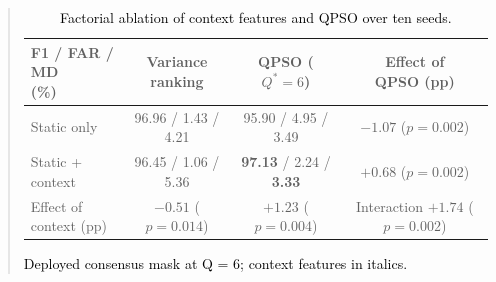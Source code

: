 \documentclass[11pt]{article}
\newenvironment{excerpt}{\begin{quote}\sloppy}{\end{quote}}
\begin{document}
\begin{excerpt}
\setcounter{table}{9}
\begin{table}[H]
\centering
\scriptsize
\caption{\textcolor{black}{Factorial ablation of context features and QPSO over ten seeds.}}

\color{black}
\setlength{\tabcolsep}{3pt}
\begin{adjustbox}{max width=\linewidth}
\begin{tabular}{lccc}
\hline\toprule
\makecell[l]{F1 / FAR / MD\\(\%)} & \makecell{Variance\\ranking} & \makecell{QPSO\\($Q^{*}{=}6$)} & \makecell{Effect of\\QPSO (pp)} \\
\hline\toprule
Static only & 96.96 / 1.43 / 4.21 & 95.90 / 4.95 / 3.49 & \makecell{$-1.07$\\($p{=}0.002$)} \\
\makecell[l]{Static +\\context} & 96.45 / 1.06 / 5.36 & \textbf{97.13} / 2.24 / \textbf{3.33} & \makecell{$+0.68$\\($p{=}0.002$)} \\
\midrule
\makecell[l]{Effect of\\context (pp)} & \makecell{$-0.51$\\($p{=}0.014$)} & \makecell{$+1.23$\\($p{=}0.004$)} & \makecell{Interaction\\$+1.74$\\($p{=}0.002$)} \\
\hline\toprule
\end{tabular}
\end{adjustbox}
\end{table}

\setcounter{table}{10}
\begin{table}[H]
\centering
\scriptsize
\caption{\textcolor{black}{Deployed consensus mask at Q = 6; context features in italics.}}


\end{table}
\end{excerpt}
\end{document}
